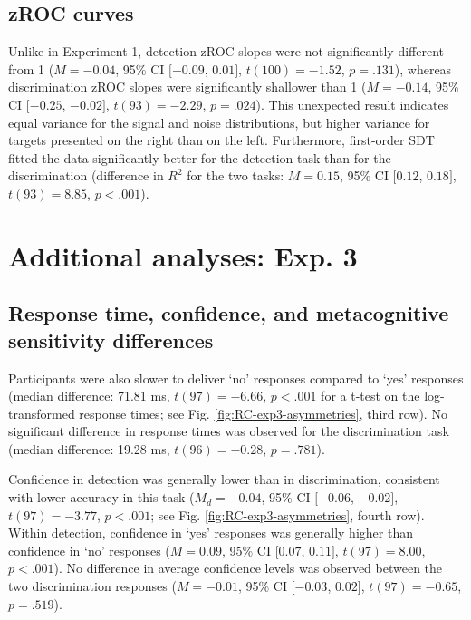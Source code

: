 \documentclass[12pt,twoside]{reedthesis}
\begin{document}
\hypertarget{zroc-curves-1}{%
\subsection{zROC curves}\label{zroc-curves-1}}

Unlike in Experiment 1, detection zROC slopes were not significantly different from 1 (\(M = -0.04\), 95\% CI \([-0.09\), \(0.01]\), \(t(100) = -1.52\), \(p = .131\)), whereas discrimination zROC slopes were significantly shallower than 1 (\(M = -0.14\), 95\% CI \([-0.25\), \(-0.02]\), \(t(93) = -2.29\), \(p = .024\)). This unexpected result indicates equal variance for the signal and noise distributions, but higher variance for targets presented on the right than on the left. Furthermore, first-order SDT fitted the data significantly better for the detection task than for the discrimination (difference in \(R^2\) for the two tasks: \(M = 0.15\), 95\% CI \([0.12\), \(0.18]\), \(t(93) = 8.85\), \(p < .001\)).

\hypertarget{additional-analyses-exp.-3}{%
\section{Additional analyses: Exp. 3}\label{additional-analyses-exp.-3}}

\hypertarget{appRC-asymmetries3}{%
\subsection{Response time, confidence, and metacognitive sensitivity differences}\label{appRC-asymmetries3}}

Participants were also slower to deliver `no' responses compared to `yes' responses (median difference: 71.81 ms, \(t(97) = -6.66\), \(p < .001\) for a t-test on the log-transformed response times; see Fig. \ref{fig:RC-exp3-asymmetries}, third row). No significant difference in response times was observed for the discrimination task (median difference: 19.28 ms, \(t(96) = -0.28\), \(p = .781\)).

Confidence in detection was generally lower than in discrimination, consistent with lower accuracy in this task (\(M_d = -0.04\), 95\% CI \([-0.06\), \(-0.02]\), \(t(97) = -3.77\), \(p < .001\); see Fig. \ref{fig:RC-exp3-asymmetries}, fourth row). Within detection, confidence in `yes' responses was generally higher than confidence in `no' responses (\(M = 0.09\), 95\% CI \([0.07\), \(0.11]\), \(t(97) = 8.00\), \(p < .001\)). No difference in average confidence levels was observed between the two discrimination responses (\(M = -0.01\), 95\% CI \([-0.03\), \(0.02]\), \(t(97) = -0.65\), \(p = .519\)).
\end{document}
